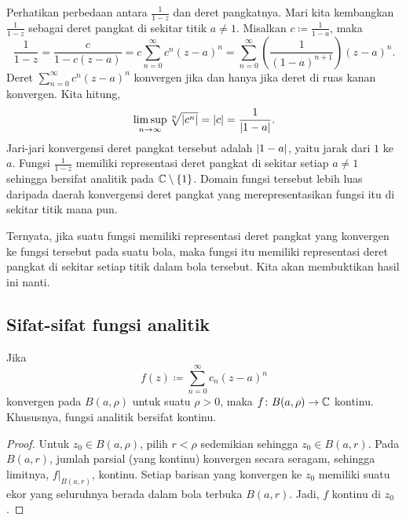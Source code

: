\begin{example}
Perhatikan perbedaan antara $\frac{1}{1-z}$ dan deret pangkatnya.  Mari kita
kembangkan $\frac{1}{1-z}$ sebagai deret pangkat di sekitar titik $a \neq 1$.
Misalkan $c \coloneqq \frac{1}{1-a}$, maka
\begin{equation*}
\frac{1}{1-z} =
\frac{c}{1-c(z-a)}
=
c
\sum_{n=0}^\infty c^{n} {(z-a)}^n
=
\sum_{n=0}^\infty \left( \frac{1}{{(1-a)}^{n+1}} \right) {(z-a)}^n .
\end{equation*}
Deret $\sum_{n=0}^\infty c^n {(z-a)}^n$ konvergen jika dan hanya jika
deret di ruas kanan konvergen.  Kita hitung,
\begin{equation*}
\limsup_{n\to\infty}
\sqrt[n]{\lvert {c^n} \rvert} = \lvert {c} \rvert
= \frac{1}{\lvert {1-a} \rvert} .
\end{equation*}
Jari-jari konvergensi deret pangkat tersebut adalah $\lvert {1-a} \rvert$, yaitu
jarak dari $1$ ke $a$.  Fungsi $\frac{1}{1-z}$
memiliki representasi deret pangkat
di sekitar setiap $a \neq 1$ sehingga bersifat analitik pada ${\mathbb{C}} \setminus
\{ 1 \}$.
Domain fungsi tersebut lebih luas daripada daerah
konvergensi deret pangkat yang merepresentasikan fungsi itu di sekitar titik mana pun.
\end{example}

Ternyata,
jika suatu fungsi memiliki representasi deret pangkat yang konvergen ke fungsi tersebut
pada suatu bola,
maka fungsi itu memiliki representasi deret pangkat di sekitar setiap titik dalam bola tersebut.  Kita akan membuktikan
hasil ini nanti.

\subsection{Sifat-sifat fungsi analitik}

\begin{prop}
Jika
\begin{equation*}
f(z) \coloneqq \sum_{n=0}^\infty c_n {(z-a)}^n
\end{equation*}
konvergen pada $B(a,\rho)$ untuk suatu $\rho > 0$, maka
$f \colon B(a,\rho) \to {\mathbb{C}}$ kontinu.
Khususnya, fungsi analitik bersifat kontinu.
\end{prop}

\begin{proof}
Untuk $z_0 \in B(a,\rho)$, pilih $r < \rho$ sedemikian sehingga $z_0 \in B(a,r)$.
Pada $B(a,r)$,
jumlah parsial (yang kontinu) konvergen secara seragam,
sehingga limitnya, $f|_{B(a,r)}$, kontinu.
Setiap barisan yang konvergen ke
$z_0$ memiliki suatu ekor yang seluruhnya berada dalam bola terbuka $B(a,r)$.
Jadi, $f$ kontinu di $z_0$.
\end{proof}

